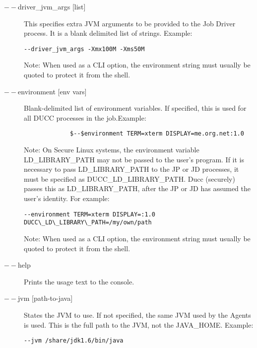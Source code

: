 \begin{description}
           \item[$--$driver\_jvm\_args {[list]} ]

             This specifies extra JVM arguments to be provided to the Job Driver process. It is a blank delimited 
             list of strings. Example: 
             \begin{verbatim}
--driver_jvm_args -Xmx100M -Xms50M 
             \end{verbatim}

             Note: When used as a CLI option, the environment string must usually be
             quoted to protect it from the shell.
             
           \item[$--$environment {[env vars]}] Blank-delimited list of environment variables. If
             specified, this is used for all DUCC processes in the job.Example:
\begin{verbatim}
             $--$environment TERM=xterm DISPLAY=me.org.net:1.0 
\end{verbatim}
             
             Note: On Secure Linux systems, the environment variable 
             LD\_LIBRARY\_PATH may not be passed to the user's program. If it is 
             necessary to pass LD\_LIBRARY\_PATH to the JP or JD processes, it must be 
             specified as DUCC\_LD\_LIBRARY\_PATH. Ducc (securely) passes this as 
             LD\_LIBRARY\_PATH, after the JP or JD has assumed the user's identity. For 
             example: 
             \begin{verbatim}
--environment TERM=xterm DISPLAY=:1.0 DUCC\_LD\_LIBRARY\_PATH=/my/own/path
            \end{verbatim}

             Note: When used as a CLI option, the environment string must usually be
             quoted to protect it from the shell.

           \item[$--$help ]

             Prints the usage text to the console. 

           \item[$--$jvm {[path-to-java]}  ]

             States the JVM to use. If not specified, the same JVM used by the Agents is used.  This is
             the full path to the JVM, not the JAVA\_HOME.
             Example: 
\begin{verbatim}
--jvm /share/jdk1.6/bin/java 
\end{verbatim}
             

\end{description}
